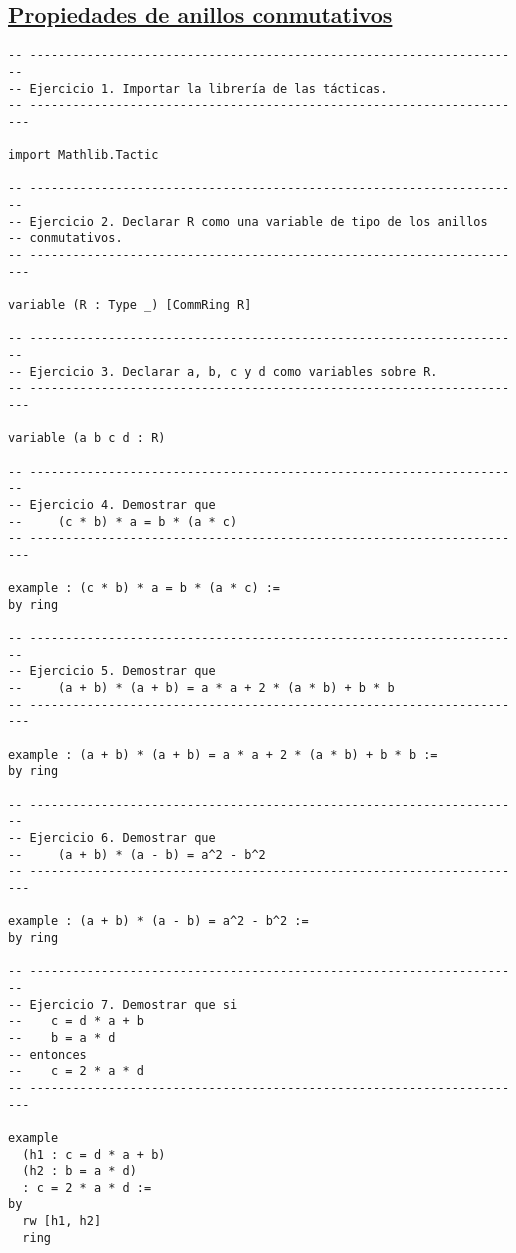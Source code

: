\subsection{\href{./src/Basicos/Propiedades\_de\_anillos\_conmutativos.lean}{Propiedades de anillos conmutativos}}
\label{sec:org03d3015}
\begin{verbatim}
-- ---------------------------------------------------------------------
-- Ejercicio 1. Importar la librería de las tácticas.
-- ----------------------------------------------------------------------

import Mathlib.Tactic

-- ---------------------------------------------------------------------
-- Ejercicio 2. Declarar R como una variable de tipo de los anillos
-- conmutativos.
-- ----------------------------------------------------------------------

variable (R : Type _) [CommRing R]

-- ---------------------------------------------------------------------
-- Ejercicio 3. Declarar a, b, c y d como variables sobre R.
-- ----------------------------------------------------------------------

variable (a b c d : R)

-- ---------------------------------------------------------------------
-- Ejercicio 4. Demostrar que
--     (c * b) * a = b * (a * c)
-- ----------------------------------------------------------------------

example : (c * b) * a = b * (a * c) :=
by ring

-- ---------------------------------------------------------------------
-- Ejercicio 5. Demostrar que
--     (a + b) * (a + b) = a * a + 2 * (a * b) + b * b
-- ----------------------------------------------------------------------

example : (a + b) * (a + b) = a * a + 2 * (a * b) + b * b :=
by ring

-- ---------------------------------------------------------------------
-- Ejercicio 6. Demostrar que
--     (a + b) * (a - b) = a^2 - b^2
-- ----------------------------------------------------------------------

example : (a + b) * (a - b) = a^2 - b^2 :=
by ring

-- ---------------------------------------------------------------------
-- Ejercicio 7. Demostrar que si
--    c = d * a + b
--    b = a * d
-- entonces
--    c = 2 * a * d
-- ----------------------------------------------------------------------

example
  (h1 : c = d * a + b)
  (h2 : b = a * d)
  : c = 2 * a * d :=
by
  rw [h1, h2]
  ring
\end{verbatim}

